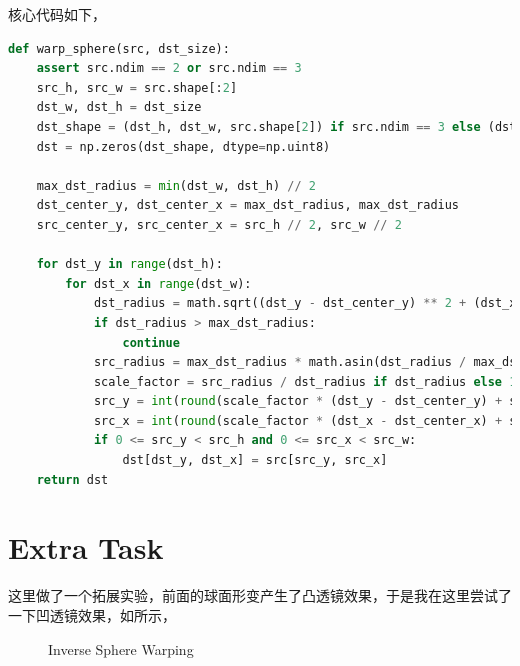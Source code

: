 \documentclass[12pt,a4paper]{article}
\begin{document}
核心代码如下，
\begin{lstlisting}[language=Python]
def warp_sphere(src, dst_size):
    assert src.ndim == 2 or src.ndim == 3
    src_h, src_w = src.shape[:2]
    dst_w, dst_h = dst_size
    dst_shape = (dst_h, dst_w, src.shape[2]) if src.ndim == 3 else (dst_h, dst_w)
    dst = np.zeros(dst_shape, dtype=np.uint8)

    max_dst_radius = min(dst_w, dst_h) // 2
    dst_center_y, dst_center_x = max_dst_radius, max_dst_radius
    src_center_y, src_center_x = src_h // 2, src_w // 2

    for dst_y in range(dst_h):
        for dst_x in range(dst_w):
            dst_radius = math.sqrt((dst_y - dst_center_y) ** 2 + (dst_x - dst_center_x) ** 2)
            if dst_radius > max_dst_radius:
                continue
            src_radius = max_dst_radius * math.asin(dst_radius / max_dst_radius)
            scale_factor = src_radius / dst_radius if dst_radius else 1
            src_y = int(round(scale_factor * (dst_y - dst_center_y) + src_center_y))
            src_x = int(round(scale_factor * (dst_x - dst_center_x) + src_center_x))
            if 0 <= src_y < src_h and 0 <= src_x < src_w:
                dst[dst_y, dst_x] = src[src_y, src_x]
    return dst
\end{lstlisting}

\section{Extra Task}

这里做了一个拓展实验，前面的球面形变产生了凸透镜效果，于是我在这里尝试了一下凹透镜效果，如所示，
\begin{figure}[H]
    \centering
    \caption{Inverse Sphere Warping}
    \label{fig:sphere_inv}
\end{figure}
\end{document}
